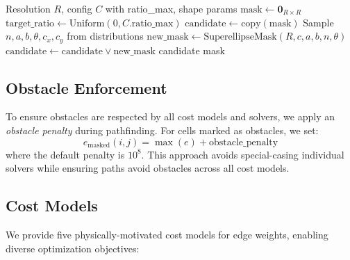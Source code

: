 \documentclass{article}
\let\authAND\AND
\let\AND\relax
\let\AND\authAND
\begin{document}
\begin{algorithm}[h]
\caption{Obstacle Generation}
\label{alg:obstacles}
\begingroup
\let\AND\relax
\begin{algorithmic}[1]
\REQUIRE Resolution $R$, config $C$ with ratio\_max, shape params
\STATE $\text{mask} \gets \mathbf{0}_{R \times R}$
\STATE $\text{target\_ratio} \gets \text{Uniform}(0, C.\text{ratio\_max})$
    \STATE $\text{candidate} \gets \text{copy}(\text{mask})$
        \STATE Sample $n, a, b, \theta, c_x, c_y$ from distributions
        \STATE $\text{new\_mask} \gets \text{SuperellipseMask}(R, c, a, b, n, \theta)$
            \STATE $\text{candidate} \gets \text{candidate} \lor \text{new\_mask}$
        \ENDIF
    \ENDFOR
        \RETURN candidate
    \ENDIF
\ENDFOR
\RETURN mask
\end{algorithmic}
\endgroup
\end{algorithm}

\subsection{Obstacle Enforcement}

To ensure obstacles are respected by all cost models and solvers, we apply an \emph{obstacle penalty} during pathfinding. For cells marked as obstacles, we set:
\begin{equation}
e_{\text{masked}}(i,j) = \max(e) + \text{obstacle\_penalty}
\end{equation}
where the default penalty is $10^8$. This approach avoids special-casing individual solvers while ensuring paths avoid obstacles across all cost models.

\subsection{Cost Models}

We provide five physically-motivated cost models for edge weights, enabling diverse optimization objectives:
\end{document}
